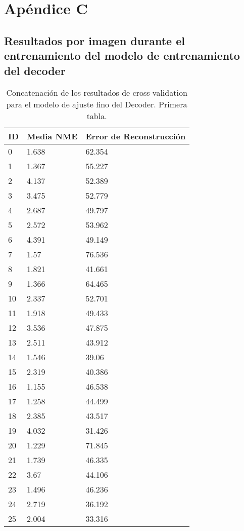 
\chapter{Apéndice C}\label{ap:apendiceC}

\section{Resultados por imagen durante el entrenamiento del modelo de entrenamiento del decoder}

\begin{table}[!ht]
    \centering
    \caption{Concatenación de los resultados de cross-validation para el modelo de ajuste fino del Decoder. Primera tabla.}
    \begin{tabular}{|l|l|l|}
    \hline
    \cellcolor{gray!25}\textbf{ID} & \cellcolor{gray!25}\textbf{Media NME} & \cellcolor{gray!25}\textbf{Error de Reconstrucción} \\ \hline
        0 & 1.638 & 62.354 \\ \hline
        1 & 1.367 & 55.227 \\ \hline
        2 & 4.137 & 52.389 \\ \hline
        3 & 3.475 & 52.779 \\ \hline
        4 & 2.687 & 49.797 \\ \hline
        5 & 2.572 & 53.962 \\ \hline
        6 & 4.391 & 49.149 \\ \hline
        7 & 1.57 & 76.536 \\ \hline
        8 & 1.821 & 41.661 \\ \hline
        9 & 1.366 & 64.465 \\ \hline
        10 & 2.337 & 52.701 \\ \hline
        11 & 1.918 & 49.433 \\ \hline
        12 & 3.536 & 47.875 \\ \hline
        13 & 2.511 & 43.912 \\ \hline
        14 & 1.546 & 39.06 \\ \hline
        15 & 2.319 & 40.386 \\ \hline
        16 & 1.155 & 46.538 \\ \hline
        17 & 1.258 & 44.499 \\ \hline
        18 & 2.385 & 43.517 \\ \hline
        19 & 4.032 & 31.426 \\ \hline
        20 & 1.229 & 71.845 \\ \hline
        21 & 1.739 & 46.335 \\ \hline
        22 & 3.67 & 44.106 \\ \hline
        23 & 1.496 & 46.236 \\ \hline
        24 & 2.719 & 36.192 \\ \hline
        25 & 2.004 & 33.316 \\ \hline
    \end{tabular}
\end{table}

